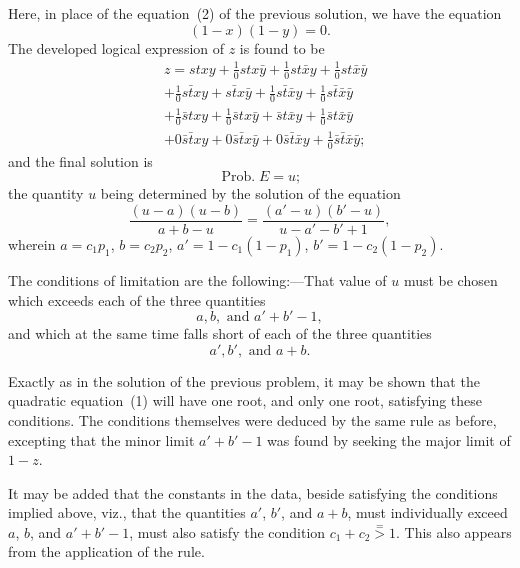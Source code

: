 \documentclass[oneside]{book}
\begin{document}
Here, in place of the equation~(2) of the previous solution, we
have the equation
\begin{equation*}
(1-x)(1-y) = 0.
\end{equation*}
The developed logical expression of $z$ is found to be
\begin{equation*}\begin{split}
& z = stxy + \frac{1}{0} stx\bar{y} + \frac{1}{0}st\bar{x}y + \frac{1}{0} st\bar{x}\bar{y} \\
& + \frac{1}{0}s\bar{t}xy + s\bar{t}x\bar{y} + \frac{1}{0}s\bar{t}\bar{x}y + \frac{1}{0} s\bar{t}\bar{x}\bar{y} \\
& + \frac{1}{0}\bar{s}txy + \frac{1}{0} \bar{s}tx\bar{y} + \bar{s}t\bar{x}y + \frac{1}{0}\bar{s}t\bar{x}\bar{y} \\
& + 0 \bar{s}\bar{t}xy + 0 \bar{s}\bar{t}x\bar{y} + 0\bar{s}\bar{t}\bar{x}y + \frac{1}{0}\bar{s}\bar{t}\bar{x}\bar{y};
\end{split}
\end{equation*}
and the final solution is
\begin{equation*}
\operatorname{Prob. } E = u;
\end{equation*}
the quantity $u$ being determined by the solution of the equation
\begin{equation*}\tag{1}
\frac{(u-a)(u-b)}{a+b-u}=\frac{(a'-u)(b'-u)}{u-a'-b'+1},
\end{equation*}
wherein $a=c_1 p_1$, $b=c_2 p_2$, $a'=1 - c_1(1-p_1)$, $b'=1-c_2(1-p_2)$.

The conditions of limitation are the following:---That value
of $u$ must be chosen which exceeds each of the three quantities
\begin{equation*}
a, b, \text{ and } a' + b'-1,
\end{equation*}
and which at the same time falls short of each of the three quantities
\begin{equation*}
a', b', \text{ and } a + b.
\end{equation*}

Exactly as in the solution of the previous problem, it may be
shown that the quadratic equation~(1) will have one root, and
only one root, satisfying these conditions. The conditions themselves
were deduced by the same rule as before, excepting that
the minor limit $a' + b'-1$ was found by seeking the major limit
of $1-z$.

It may be added that the constants in the data, beside
satisfying the conditions implied above, viz., that the quantities $a'$, $b'$,
and $a + b$, must individually exceed $a$, $b$, and $a' + b'-1$, must
also satisfy the condition $c_1 + c_2 \stackrel{=}{>} 1$. This also appears from the
application of the rule.
\end{document}
